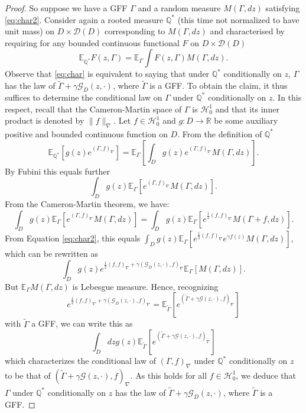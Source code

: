 \documentclass[11pt]{amsart}
\newtheorem{rem}[thm]{Remark}
\newcommand{\Q}{\mathbb Q}
\newcommand{\R}{\mathbb R}
\newcommand{\G}{\mathcal G}
\newcommand{\E}{\mathbb E}
\renewcommand{\1}{\mathbf 1}
\begin{document}
\begin{proof}
So suppose we have a GFF $\Gamma$ and a random measure $M(\Gamma,dz)$ satisfying \eqref{eq:char2}. Consider again a rooted measure $\Q^*$ (this time not normalized to have unit mass) on $D\times \mathcal{D}(D)$ corresponding to $M(\Gamma,dz)$ and characterised by requiring for any bounded continuous functional $F$ on $D \times \mathcal{D}(D)$ 
$$\E_{\Q^*} F(z,\Gamma) = \E_\Gamma \int F(z,\Gamma)M(\Gamma,dz).$$
Observe that \eqref{eq:char} is equivalent to saying that under $\Q^*$ conditionally on $z$, $\Gamma$ has the law of $\tilde \Gamma + \gamma \G_D(z,\cdot)$, where $\tilde \Gamma$ is a GFF. To obtain the claim, it thus suffices to determine the conditional law on $\Gamma$ under $\Q^*$ conditionally on $z$. In this respect, recall that the Cameron-Martin space of $\Gamma$ is $\mathcal{H}^1_0$ and that its inner product is denoted by $\|f\|_\nabla$. Let $f \in \mathcal{H}^1_0$ and $g:D \to \R$ be some auxiliary positive and bounded continuous function on $D$. From the definition of $\Q^*$
$$\E_{\Q^*} \left[g(z) e^{(\Gamma, f)_\nabla}\right] = \E_\Gamma \left[\int_D g(z)e^{(\Gamma, f)_\nabla} M(\Gamma, dz)\right].$$ 
By Fubini this equals further
$$\int_D g(z) \E_\Gamma \left[e^{(\Gamma, f)_\nabla} M(\Gamma, dz)\right].$$
From the Cameron-Martin theorem, we have:
$$\int_D g(z) \E_\Gamma \left[e^{(\Gamma, f)_\nabla} M(\Gamma, dz)\right] = \int_D g(z) \E_\Gamma\left[e^{\frac{1}{2} (f, f)_\nabla} M(\Gamma+f, dz)\right].$$
From Equation \eqref{eq:char2}, this equals $\int_D g(z) \E_\Gamma \left[ e^{\frac{1}{2} (f, f)_\nabla} e^{\gamma f(z)}  M(\Gamma, dz)\right]$, which can be rewritten as $$\int_D g(z) e^{\frac{1}{2} (f, f)_\nabla +\gamma (\G_D(z,\cdot), f)_\nabla}\E_\Gamma\left[M(\Gamma, dz)\right].$$
But $\E_\Gamma M(\Gamma,dz)$ is Lebesgue measure. Hence, recognizing $$e^{\frac{1}{2} (f, f)_\nabla +\gamma (\G_D(z,\cdot), f)_\nabla}=\E_{\tilde \Gamma} \left[e^{(\tilde \Gamma+\gamma \G(z, \cdot),f)_\nabla}\right]$$ with $\tilde \Gamma$ a GFF, we can write this as
$$\int_D dzg(z) \E_{\tilde \Gamma} \left[e^{(\tilde \Gamma+\gamma \G(z, \cdot),f)_\nabla}\right]$$
which characterizes the conditional law of $(\Gamma,f)_\nabla$ under $\Q^*$ conditionally on $z$ to be that of $(\tilde \Gamma+\gamma \G(z, \cdot),f)_\nabla$. As this holds for all $f \in \mathcal{H}^1_0$, we deduce that $\Gamma$ under $\Q^*$ conditionally on $z$ has the law of $\tilde \Gamma + \gamma \G_D(z,\cdot)$, where $\tilde \Gamma$ is a GFF.
\end{proof}
\end{document}

